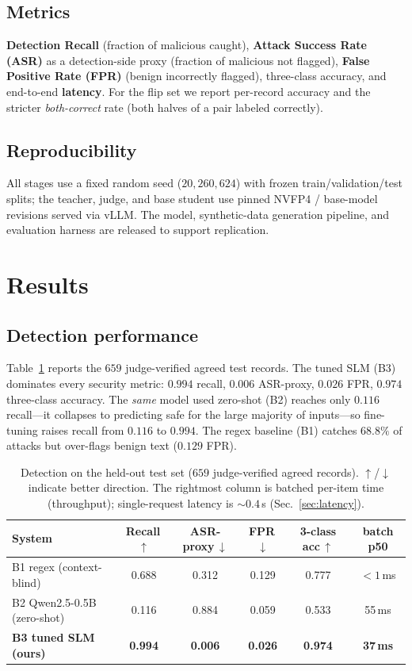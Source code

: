 \documentclass[11pt]{article}
\begin{document}
\subsection{Metrics}
\textbf{Detection Recall} (fraction of malicious caught), \textbf{Attack Success Rate
(ASR)} as a detection-side proxy (fraction of malicious not flagged), \textbf{False
Positive Rate (FPR)} (benign incorrectly flagged), three-class accuracy, and
end-to-end \textbf{latency}. For the flip set we report per-record accuracy and the
stricter \emph{both-correct} rate (both halves of a pair labeled correctly).

\subsection{Reproducibility}
All stages use a fixed random seed ($20{,}260{,}624$) with frozen train/validation/test
splits; the teacher, judge, and base student use pinned NVFP4 / base-model revisions
served via vLLM. The model, synthetic-data generation pipeline, and evaluation harness
are released to support replication.

\section{Results}
\subsection{Detection performance}
Table~\ref{tab:main} reports the $659$ judge-verified agreed test records. The tuned
SLM (B3) dominates every security metric: $0.994$ recall, $0.006$ ASR-proxy, $0.026$
FPR, $0.974$ three-class accuracy. The \emph{same} model used zero-shot (B2) reaches
only $0.116$ recall---it collapses to predicting \textsf{safe} for the large majority
of inputs---so fine-tuning raises recall from $0.116$ to $0.994$. The regex baseline
(B1) catches $68.8\%$ of attacks but over-flags benign text ($0.129$ FPR).

\begin{table}[t]
\centering
\caption{Detection on the held-out test set ($659$ judge-verified agreed records).
$\uparrow$/$\downarrow$ indicate better direction. The rightmost column is batched
per-item time (throughput); single-request latency is ${\sim}0.4$\,s (Sec.~\ref{sec:latency}).}
\label{tab:main}
\begin{tabular}{lccccc}
\toprule
System & Recall\,$\uparrow$ & ASR-proxy\,$\downarrow$ & FPR\,$\downarrow$ &
3-class acc\,$\uparrow$ & batch p50 \\
\midrule
B1 regex (context-blind)      & 0.688 & 0.312 & 0.129 & 0.777 & $<\!1$\,ms \\
B2 Qwen2.5-0.5B (zero-shot)   & 0.116 & 0.884 & 0.059 & 0.533 & 55\,ms \\
\textbf{B3 tuned SLM (ours)}  & \textbf{0.994} & \textbf{0.006} & \textbf{0.026} &
\textbf{0.974} & \textbf{37\,ms} \\
\bottomrule
\end{tabular}
\end{table}
\end{document}
